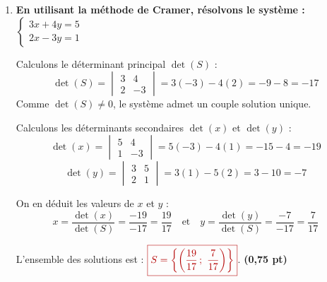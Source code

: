 \documentclass[12pt,a4paper]{article}
\newcommand{\redtitle}[1]{\textcolor{myred}{\textbf{#1}}}
\newcommand{\redbox}[1]{\color{myred}\boxed{#1}\color{black}}
\begin{document}
\begin{enumerate}
\begin{enumerate}
        \item $\begin{cases} x^3 + y^3 = 7 \\ x + y = 1 \end{cases}$
        
        On sait que $x^3 + y^3 = (x+y)(x^2 - xy + y^2) = (x+y)[(x+y)^2 - 3xy]$.
        La première équation devient :
        \[ 1 \cdot (1^2 - 3xy) = 7 \iff 1 - 3xy = 7 \iff -3xy = 6 \iff xy = -2 \]
        On cherche deux nombres de somme $S=1$ et produit $P=-2$, solutions de $t^2 - t - 2 = 0$.
        Les racines sont $t_1 = -1$ et $t_2 = 2$.
        
        L'ensemble des solutions est : 
        
        $\redbox{S = \{(-1 \,;~ 2) \,;~ (2 \,;~ -1)\}}$. \hfill \textbf{(0,75 pt)}
    \end{enumerate}

    \item \redtitle{En utilisant la méthode de Cramer, résolvons le système :} $\begin{cases} 3x + 4y = 5 \\ 2x - 3y = 1 \end{cases}$
    
    Calculons le déterminant principal $\det(S)$ :
    \[ \det(S) = \begin{vmatrix} 3 & 4 \\ 2 & -3 \end{vmatrix} = 3(-3) - 4(2) = -9 - 8 = -17 \]
    Comme $\det(S) \neq 0$, le système admet un couple solution unique.
    
    Calculons les déterminants secondaires $\det(x)$ et $\det(y)$ :
    \[ \det(x) = \begin{vmatrix} 5 & 4 \\ 1 & -3 \end{vmatrix} = 5(-3) - 4(1) = -15 - 4 = -19 \]
    \[ \det(y) = \begin{vmatrix} 3 & 5 \\ 2 & 1 \end{vmatrix} = 3(1) - 5(2) = 3 - 10 = -7 \]
    
    On en déduit les valeurs de $x$ et $y$ :
    \[ x = \dfrac{\det(x)}{\det(S)} = \dfrac{-19}{-17} = \dfrac{19}{17} \quad \text{et} \quad y = \dfrac{\det(y)}{\det(S)} = \dfrac{-7}{-17} = \dfrac{7}{17} \]
    
    L'ensemble des solutions est : $\redbox{S = \left\{\left(\dfrac{19}{17} \,;~ \dfrac{7}{17}\right)\right\}}$. \hfill \textbf{(0,75 pt)}
\end{enumerate}
\end{document}
